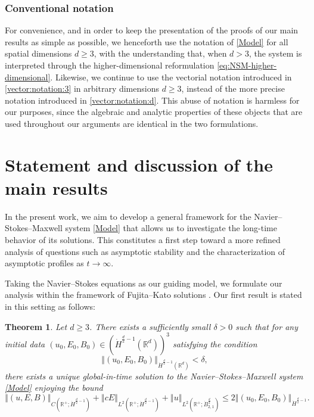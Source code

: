 \documentclass[11pt, leqno, a4paper,]{amsart}
\newtheorem{theorem}{Theorem}[section]
\theoremstyle{remark}
\numberwithin{equation}{section}
\newcommand*{\norm}[1]{\left\Vert #1\right\Vert}
\begin{document}
\subsubsection*{\textbf{Conventional notation}} For convenience, and in order to keep the presentation of the proofs of our main results as simple as possible, we henceforth use the notation of \eqref{Model} for all spatial dimensions $d\geq3$, with the understanding that, when $d>3$, the system is interpreted through the higher-dimensional reformulation \eqref{eq:NSM-higher-dimensional}. Likewise, we continue to use the vectorial notation introduced in \eqref{vector:notation:3} in arbitrary dimensions $d\geq3$, instead of the more precise notation introduced in \eqref{vector:notation:d}. This abuse of notation is harmless for our purposes, since the algebraic and analytic properties of these objects that are used throughout our arguments are identical in the two formulations. 
 







\section{Statement and discussion of the main results}\label{sec:main}



In the present work, we aim to develop a general framework for the Navier--Stokes--Maxwell system \eqref{Model} that allows us to investigate the long-time behavior of its solutions. This constitutes a first step toward a more refined analysis of questions such as asymptotic stability and the characterization of asymptotic profiles as $t\to\infty$.

Taking the Navier--Stokes equations as our guiding model, we formulate our analysis within the framework of Fujita--Kato solutions \cite{Fujita_1964}. Our first result is stated in this setting as follows:




 
\begin{theorem}\label{thm:critical:wp}
	Let $d\geq 3$.  
	There exists a sufficiently small $\delta>0$ such that for any initial data 
	 $(u_0, E_0, B_0)\in (\dot H^{\frac{d}{2}-1} (\mathbb R^d))^3$   satisfying the condition 
	\begin{equation*}
		\norm {(u_0,E_0,B_0)}_{\dot H^{\frac{d}{2}-1} (\mathbb {R}^d)} < \delta,
	\end{equation*}
	there exists a  unique global-in-time solution to the Navier--Stokes--Maxwell system \eqref{Model} enjoying the bound 
	\begin{equation*}
		\norm {(u,E,B)}_{C(\mathbb {R}^+; \dot H^{\frac{d}{2} -1})} + \norm {cE}_{L^2 (\mathbb {R}^+; \dot H^{\frac{d}{2} -1})} +  \norm {u}_{L^2 (\mathbb {R}^+; \dot B^{\frac{d}{2} }_{2,1})} \leq 2 \norm {(u_0,E_0,B_0)}_{\dot H^{\frac{d}{2}-1}  }.
	\end{equation*}
	
	
\end{theorem}
\end{document}
